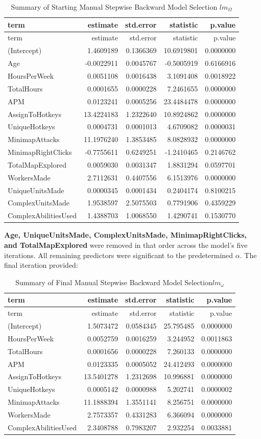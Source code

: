 \documentclass[]{article}
\begin{document}
\begin{longtable}[]{@{}lrrrr@{}}
\caption{Summary of Starting Manual Stepwise Backward Model Selection
\(lm_\Omega\)}\tabularnewline
\toprule
term & estimate & std.error & statistic & p.value\tabularnewline
\midrule
\endfirsthead
\toprule
term & estimate & std.error & statistic & p.value\tabularnewline
\midrule
\endhead
(Intercept) & 1.4609189 & 0.1366369 & 10.6919801 &
0.0000000\tabularnewline
Age & -0.0022911 & 0.0045767 & -0.5005919 & 0.6166916\tabularnewline
HoursPerWeek & 0.0051108 & 0.0016438 & 3.1091408 &
0.0018922\tabularnewline
TotalHours & 0.0001655 & 0.0000228 & 7.2461655 &
0.0000000\tabularnewline
APM & 0.0123241 & 0.0005256 & 23.4484478 & 0.0000000\tabularnewline
AssignToHotkeys & 13.4224183 & 1.2322640 & 10.8924862 &
0.0000000\tabularnewline
UniqueHotkeys & 0.0004731 & 0.0001013 & 4.6709082 &
0.0000031\tabularnewline
MinimapAttacks & 11.1976240 & 1.3853485 & 8.0828932 &
0.0000000\tabularnewline
MinimapRightClicks & -0.7755611 & 0.6249251 & -1.2410465 &
0.2146762\tabularnewline
TotalMapExplored & 0.0059030 & 0.0031347 & 1.8831294 &
0.0597701\tabularnewline
WorkersMade & 2.7112631 & 0.4407556 & 6.1513976 &
0.0000000\tabularnewline
UniqueUnitsMade & 0.0000345 & 0.0001434 & 0.2404174 &
0.8100215\tabularnewline
ComplexUnitsMade & 1.9538597 & 2.5075503 & 0.7791906 &
0.4359229\tabularnewline
ComplexAbilitiesUsed & 1.4388703 & 1.0068550 & 1.4290741 &
0.1530770\tabularnewline
\bottomrule
\end{longtable}

\textbf{Age, UniqueUnitsMade, ComplexUnitsMade, MinimapRightClicks, and
TotalMapExplored} were removed in that order across the model's five
iterations. All remaining predictors were significant to the
predetermined \(\alpha\). The final iteration provided:

\begin{longtable}[]{@{}lrrrr@{}}
\caption{Summary of Final Manual Stepwise Backward Model
Selection\(lm_\omega\)}\tabularnewline
\toprule
term & estimate & std.error & statistic & p.value\tabularnewline
\midrule
\endfirsthead
\toprule
term & estimate & std.error & statistic & p.value\tabularnewline
\midrule
\endhead
(Intercept) & 1.5073472 & 0.0584345 & 25.795485 &
0.0000000\tabularnewline
HoursPerWeek & 0.0052759 & 0.0016259 & 3.244952 &
0.0011863\tabularnewline
TotalHours & 0.0001656 & 0.0000228 & 7.260133 & 0.0000000\tabularnewline
APM & 0.0123335 & 0.0005052 & 24.412493 & 0.0000000\tabularnewline
AssignToHotkeys & 13.5401278 & 1.2312698 & 10.996881 &
0.0000000\tabularnewline
UniqueHotkeys & 0.0005142 & 0.0000988 & 5.202741 &
0.0000002\tabularnewline
MinimapAttacks & 11.1888394 & 1.3551141 & 8.256751 &
0.0000000\tabularnewline
WorkersMade & 2.7573357 & 0.4331283 & 6.366094 &
0.0000000\tabularnewline
ComplexAbilitiesUsed & 2.3408788 & 0.7983207 & 2.932254 &
0.0033881\tabularnewline
\bottomrule
\end{longtable}
\end{document}
